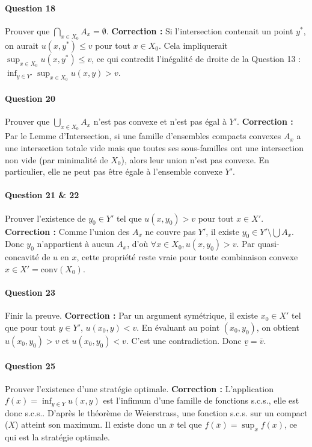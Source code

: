 \paragraph{Question 18} Prouver que $\bigcap_{x \in X_0} A_x = \emptyset$.
\textbf{Correction :} Si l'intersection contenait un point $y^*$, on aurait $u(x, y^*) \leq v$ pour tout $x \in X_0$. Cela impliquerait $\sup_{x \in X_0} u(x, y^*) \leq v$, ce qui contredit l'inégalité de droite de la Question 13 : $\inf_{y \in Y'} \sup_{x \in X_0} u(x, y) > v$.

\paragraph{Question 20} Prouver que $\bigcup_{x \in X_0} A_x$ n'est pas convexe et n'est pas égal à $Y'$.
\textbf{Correction :} Par le Lemme d'Intersection, si une famille d'ensembles compacts convexes $A_x$ a une intersection totale vide mais que toutes ses sous-familles ont une intersection non vide (par minimalité de $X_0$), alors leur union n'est pas convexe. En particulier, elle ne peut pas être égale à l'ensemble convexe $Y'$.

\paragraph{Question 21 \& 22} Prouver l'existence de $y_0 \in Y'$ tel que $u(x, y_0) > v$ pour tout $x \in X'$.
\textbf{Correction :} Comme l'union des $A_x$ ne couvre pas $Y'$, il existe $y_0 \in Y' \setminus \bigcup A_x$. Donc $y_0$ n'appartient à aucun $A_x$, d'où $\forall x \in X_0, u(x, y_0) > v$. Par quasi-concavité de $u$ en $x$, cette propriété reste vraie pour toute combinaison convexe $x \in X' = \text{conv}(X_0)$.

\paragraph{Question 23} Finir la preuve.
\textbf{Correction :} Par un argument symétrique, il existe $x_0 \in X'$ tel que pour tout $y \in Y'$, $u(x_0, y) < v$. En évaluant au point $(x_0, y_0)$, on obtient $u(x_0, y_0) > v$ et $u(x_0, y_0) < v$. C'est une contradiction. Donc $\underline{v} = \overline{v}$.

\paragraph{Question 25} Prouver l'existence d'une stratégie optimale.
\textbf{Correction :} L'application $f(x) = \inf_{y \in Y} u(x,y)$ est l'infimum d'une famille de fonctions s.c.s., elle est donc s.c.s.. D'après le théorème de Weierstrass, une fonction s.c.s. sur un compact ($X$) atteint son maximum. Il existe donc un $\overline{x}$ tel que $f(\overline{x}) = \sup_x f(x)$, ce qui est la stratégie optimale.

